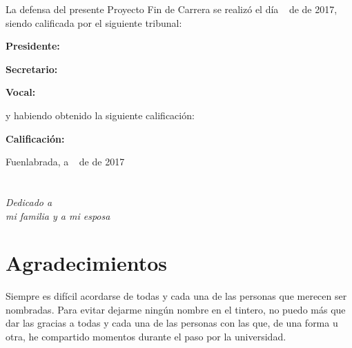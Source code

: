 \documentclass[a4paper, 12pt]{book}
\begin{document}
\vspace{1cm}
La defensa del presente Proyecto Fin de Carrera se realizó el día \qquad$\;\,$ de \qquad\qquad\qquad\qquad \newline de 2017, siendo calificada por el siguiente tribunal:


\vspace{0.5cm}
\textbf{Presidente:}

\vspace{1.2cm}
\textbf{Secretario:}

\vspace{1.2cm}
\textbf{Vocal:}


\vspace{1.2cm}
y habiendo obtenido la siguiente calificación:

\vspace{1cm}
\textbf{Calificación:}


\vspace{1cm}
\begin{flushright}
Fuenlabrada, a \qquad$\;\,$ de \qquad\qquad\qquad\qquad de 2017
\end{flushright}


\chapter*{}
\begin{flushright}
\textit{Dedicado a \\
mi familia y a mi esposa}
\end{flushright}


\chapter*{Agradecimientos}
Siempre es difícil acordarse de todas y cada una de las personas que merecen ser nombradas. Para evitar dejarme ningún nombre en el tintero, no puedo más que dar las gracias a todas y cada una de las personas con las que, de una forma u otra, he compartido momentos durante el paso por la universidad.
\end{document}
